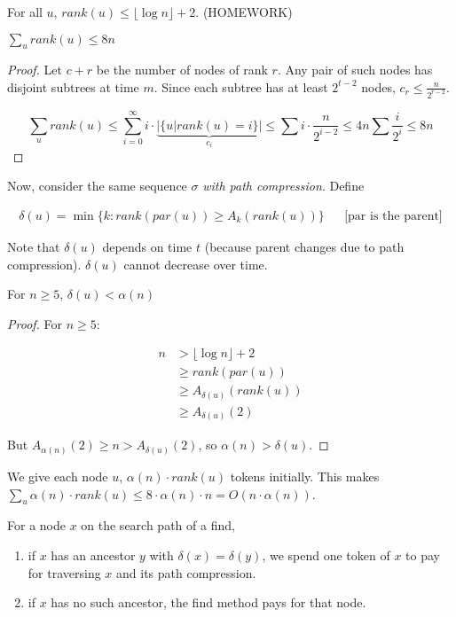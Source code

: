 \begin{mycorollary}
For all $u$, ${rank}(u) \le \lfloor \log n \rfloor + 2$. (HOMEWORK)
\end{mycorollary}

\begin{mylemma}
$\sum\limits_{u} {rank}(u) \le 8n$
\end{mylemma}
\begin{proof}
Let $c+r$ be the number of nodes of rank $r$. Any pair of such nodes has disjoint subtrees at time $m$. Since each subtree has at least $2^{t-2}$ nodes, $c_r \le \frac{n}{2^{r-2}}$.

$$\sum\limits_{u} {rank}(u) \le \sum\limits_{i=0}^\infty i \cdot \underbrace{|\{u | {rank}(u) = i\}|}_{c_i} \le \sum i \cdot \frac{n}{2^{i-2}} \le 4n \sum \frac{i}{2^i} \le 8n$$

\end{proof}

Now, consider the same sequence $\sigma$ \emph{with path compression}. Define

\begin{align*}
\delta(u) = \min \{k : {rank}({par}(u)) \ge A_k({rank}(u)) \} && \text{[par is the parent]}
\end{align*}

Note that $\delta(u)$ depends on time $t$ (because parent changes due to path compression). $\delta(u)$ cannot decrease over time.

\begin{mylemma}
For $n \ge 5$, $\delta(u) < \alpha(n)$
\end{mylemma}
\begin{proof}
For $n \ge 5$:

\begin{align*}
n &> \lfloor \log n \rfloor + 2 \\
& \ge {rank}({par}(u)) \\
& \ge A_{\delta(u)}({rank}(u)) \\
& \ge A_{\delta(u)}(2)
\end{align*}

But $A_{\alpha(n)} (2) \ge n > A_{\delta(u)}(2)$, so $\alpha(n) > \delta(u)$.
\end{proof}

We give each node $u$, $\alpha(n) \cdot {rank}(u)$ tokens initially. This makes $\sum_u \alpha(n) \cdot {rank}(u) \le 8 \cdot \alpha(n) \cdot n = O(n \cdot \alpha(n))$.

For a node $x$ on the search path of a find,
\begin{enumerate}
\item if $x$ has an ancestor $y$ with $\delta(x) = \delta(y)$, we spend one token of $x$ to pay for traversing $x$ and its path compression.
\item if $x$ has no such ancestor, the find method pays for that node.
\end{enumerate}

